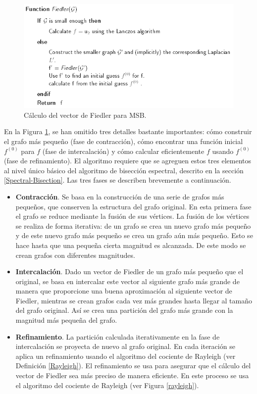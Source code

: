\begin{figure}[h]
	\centering
	\includegraphics[scale=0.8]{Figures/fiedler}
	\vspace{2mm}
	\caption{Cálculo del vector de Fiedler para MSB.}
	\label{fiedler}
\end{figure}

En la Figura \ref{fiedler}, se han omitido tres detalles bastante importantes: cómo construir el grafo más pequeño (fase de contracción), cómo encontrar una función inicial $f^{(0)}$ para $f$ (fase de intercalación) y cómo calcular eficientemente $f$ usando $f^{(0)}$ (fase de refinamiento). El algoritmo requiere que se agreguen estos tres elementos al nivel único básico del algoritmo de bisección espectral, descrito en la sección \ref{Spectral-Bisection}. Las tres fases se describen brevemente a continuación.

\begin{itemize}
	\item \textbf{Contracción}. Se basa en la construcción de una serie de grafos más pequeños, que conserven la estructura del grafo original. En esta primera fase el grafo se reduce mediante la fusión de sus vértices. La fusión de los vértices se realiza de forma iterativa: de un grafo se crea un nuevo grafo más pequeño y de este nuevo grafo más pequeño se crea un grafo aún más pequeño. Esto se hace hasta que una pequeña cierta magnitud es alcanzada. De este modo se crean grafos con diferentes magnitudes. 
	\item \textbf{Intercalación}. Dado un vector de Fiedler de un grafo más pequeño que el original, se basa en intercalar este vector al siguiente grafo más grande de manera que proporcione una buena aproximación al siguiente vector de Fiedler, mientras se crean grafos cada vez más grandes hasta llegar al tamaño del grafo original. Así se crea una partición del grafo más grande con la magnitud más pequeña del grafo. 
	\item \textbf{Refinamiento}. La partición calculada iterativamente en la fase de intercalación se proyecta de nuevo al grafo original. En cada iteración se aplica un refinamiento usando el algoritmo del cociente de Rayleigh (ver Definición \ref{Rayleigh}). El refinamiento se usa para asegurar que el cálculo del vector de Fiedler sea más preciso de manera eficiente. En este proceso se usa el algoritmo del cociente de Rayleigh (ver Figura \ref{rayleigh}). 
\end{itemize}

